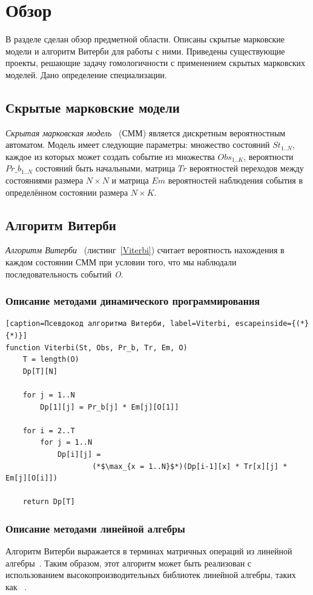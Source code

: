 \section{Обзор}
В разделе сделан обзор предметной области.
Описаны скрытые марковские модели и алгоритм Витерби для работы с ними.
Приведены существующие проекты, решающие задачу гомологичности с применением скрытых марковских моделей.
Дано определение специализации.


\subsection{Скрытые марковские модели}
\label{lab:HMM}
\emph{Скрытая марковская модель}~\cite{Eddy_CHMM} (СММ) 
является дискретным вероятностным автоматом.
Модель имеет следующие параметры: множество состояний $St_{1..N}$, 
каждое из которых может создать событие из множества
$Obs_{1..K}$, вероятности $Pr\_b_{1..N}$ состояний быть
начальными, матрица $Tr$ вероятностей переходов между состояниями размера $N
\times N$ и матрица $Em$ вероятностей наблюдения события в определённом 
состоянии размера ${N \times K}$.

\subsection{Алгоритм Витерби}
\label{lab:Viterbi}
\emph{Алгоритм Витерби}~\cite{Viterbi}
(листинг~\ref{Viterbi}) считает вероятность нахождения в 
каждом состоянии СММ при условии того, что мы наблюдали последовательность событий \emph{O}.

\subsubsection{Описание методами динамического программирования}
\label{lab:dyn_Viterbi}
\begin{lstlisting}[caption=Псевдокод алгоритма Витерби, label=Viterbi, escapeinside={(*}{*)}]
function Viterbi(St, Obs, Pr_b, Tr, Em, O)
	T = length(O)
	Dp[T][N]

	for j = 1..N
		Dp[1][j] = Pr_b[j] * Em[j][O[1]]
	
	for i = 2..T
		for j = 1..N
			Dp[i][j] = 
					(*$\max_{x = 1..N}$*)(Dp[i-1][x] * Tr[x][j] * Em[j][O[i]])

	return Dp[T]
\end{lstlisting}


\subsubsection{Описание методами линейной алгебры}
\label{lab:LA_Viterbi}
Алгоритм Витерби выражается в терминах матричных 
операций из линейной алгебры~\cite{LA_Viterbi}.
Таким образом, этот алгоритм может быть реализован с 
использованием высокопроизводительных библиотек линейной 
алгебры, таких как
~\cite{SuiteSparse}.

